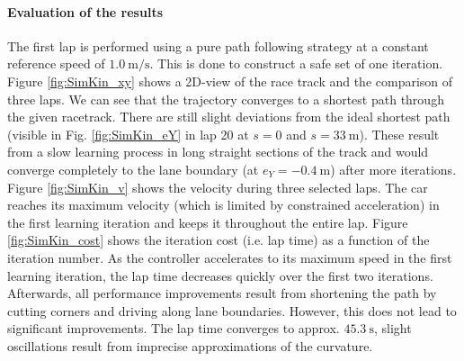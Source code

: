 \paragraph{Evaluation of the results}
The first lap is performed using a pure path following strategy at a constant reference speed of $\SI{1.0}{\meter\per\second}$. This is done to construct a safe set of one iteration.\\
Figure \ref{fig:SimKin_xy} shows a 2D-view of the race track and the comparison of three laps. We can see that the trajectory converges to a shortest path through the given racetrack. There are still slight deviations from the ideal shortest path (visible in Fig. \ref{fig:SimKin_eY} in lap 20 at $s=0$ and $s=\SI{33}{\meter}$). These result from a slow learning process in long straight sections of the track and would converge completely to the lane boundary (at $e_Y=-\SI{0.4}{\meter}$) after more iterations.\\
Figure \ref{fig:SimKin_v} shows the velocity during three selected laps. The car reaches its maximum velocity (which is limited by constrained acceleration) in the first learning iteration and keeps it throughout the entire lap. Figure \ref{fig:SimKin_cost} shows the iteration cost (i.e. lap time) as a function of the iteration number. As the controller accelerates to its maximum speed in the first learning iteration, the lap time decreases quickly over the first two iterations. Afterwards, all performance improvements result from shortening the path by cutting corners and driving along lane boundaries. However, this does not lead to significant improvements. The lap time converges to approx. $\SI{45.3}{\second}$, slight oscillations result from imprecise approximations of the curvature.
